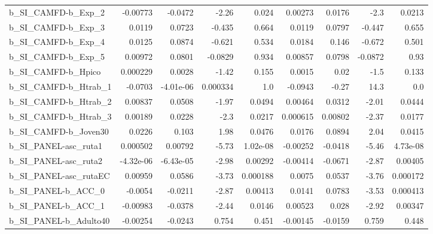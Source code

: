\begin{tabular}{lrrrrrrrr}
b\_SI\_CAMFD-b\_Exp\_2         &    -0.00773 &      -0.0472 &     -2.26 &    0.024 &    0.00273 &      0.0176 &         -2.3 &        0.0213 \\
b\_SI\_CAMFD-b\_Exp\_3         &      0.0119 &       0.0723 &    -0.435 &    0.664 &     0.0119 &      0.0797 &       -0.447 &         0.655 \\
b\_SI\_CAMFD-b\_Exp\_4         &      0.0125 &       0.0874 &    -0.621 &    0.534 &     0.0184 &       0.146 &       -0.672 &         0.501 \\
b\_SI\_CAMFD-b\_Exp\_5         &     0.00972 &       0.0801 &   -0.0829 &    0.934 &    0.00857 &      0.0798 &      -0.0872 &          0.93 \\
b\_SI\_CAMFD-b\_Hpico         &    0.000229 &       0.0028 &     -1.42 &    0.155 &     0.0015 &        0.02 &         -1.5 &         0.133 \\
b\_SI\_CAMFD-b\_Htrab\_1       &     -0.0703 &    -4.01e-06 &  0.000334 &      1.0 &    -0.0943 &       -0.27 &         14.3 &           0.0 \\
b\_SI\_CAMFD-b\_Htrab\_2       &     0.00837 &       0.0508 &     -1.97 &   0.0494 &    0.00464 &      0.0312 &        -2.01 &        0.0444 \\
b\_SI\_CAMFD-b\_Htrab\_3       &     0.00189 &       0.0228 &      -2.3 &   0.0217 &   0.000615 &     0.00802 &        -2.37 &        0.0177 \\
b\_SI\_CAMFD-b\_Joven30       &      0.0226 &        0.103 &      1.98 &   0.0476 &     0.0176 &      0.0894 &         2.04 &        0.0415 \\
b\_SI\_PANEL-asc\_ruta1       &    0.000502 &      0.00792 &     -5.73 & 1.02e-08 &   -0.00252 &     -0.0418 &        -5.46 &      4.73e-08 \\
b\_SI\_PANEL-asc\_ruta2       &   -4.32e-06 &    -6.43e-05 &     -2.98 &  0.00292 &   -0.00414 &     -0.0671 &        -2.87 &       0.00405 \\
b\_SI\_PANEL-asc\_rutaEC      &     0.00959 &       0.0586 &     -3.73 & 0.000188 &     0.0075 &      0.0537 &        -3.76 &      0.000172 \\
b\_SI\_PANEL-b\_ACC\_0         &     -0.0054 &      -0.0211 &     -2.87 &  0.00413 &     0.0141 &      0.0783 &        -3.53 &      0.000413 \\
b\_SI\_PANEL-b\_ACC\_1         &    -0.00983 &      -0.0378 &     -2.44 &   0.0146 &    0.00523 &       0.028 &        -2.92 &       0.00347 \\
b\_SI\_PANEL-b\_Adulto40      &    -0.00254 &      -0.0243 &     0.754 &    0.451 &   -0.00145 &     -0.0159 &        0.759 &         0.448 \\

\end{tabular}
